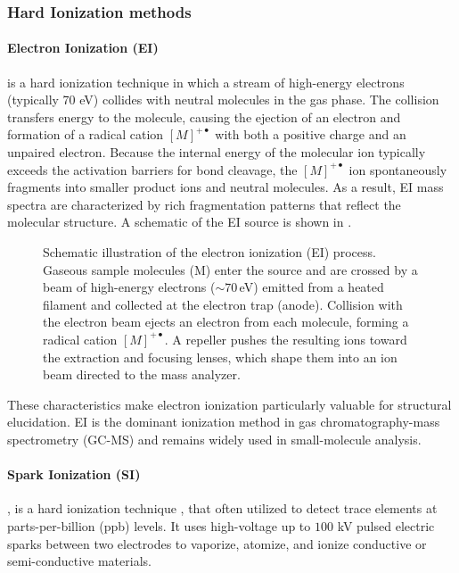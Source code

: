 \subsubsection{Hard Ionization methods}

\paragraph{Electron Ionization (EI)} is a hard ionization technique in which a stream of high-energy electrons (typically 70 eV) collides with neutral molecules in the gas phase. \cite[p.~197]{Gross2006}
The collision transfers energy to the molecule, causing the ejection of an electron and formation of a radical cation $[M]^{+\bullet}$ with both a positive charge and an unpaired electron. \cite[p.~194]{Gross2006}
Because the internal energy of the molecular ion typically exceeds the activation barriers for bond cleavage, the $[M]^{+\bullet}$ ion spontaneously fragments into smaller product ions and neutral molecules. \cite[p.~3]{Stoddard2016}
As a result, EI mass spectra are characterized by rich fragmentation patterns that reflect the molecular structure. \cite{Ashyrmamatov2025}
A schematic of the EI source is shown in .

\begin{figure}[H]
    \centering
    \resizebox{0.9\textwidth}{!}{}
    \caption[Schematic of EI ionization]{
        Schematic illustration of the electron ionization (EI) process.
        Gaseous sample molecules (M) enter the source and are crossed by a beam of high-energy electrons ($\sim 70$\,eV) emitted from a heated filament and collected at the electron trap (anode).
        Collision with the electron beam ejects an electron from each molecule, forming a radical cation $[M]^{+\bullet}$.
        A repeller pushes the resulting ions toward the extraction and focusing lenses, which shape them into an ion beam directed to the mass analyzer. \cite[p.18]{Dass2007}
    }
    \label{fig:ei-schematic}
\end{figure}


These characteristics make electron ionization particularly valuable for structural elucidation. \cite{VargasMedina2023}
EI is the dominant ionization method in gas chromatography-mass spectrometry (GC-MS) and remains widely used in small-molecule analysis. \cite[p.~1]{Amirav2021}

\paragraph{Spark Ionization (SI)}, is a hard ionization technique \cite[p.~1]{Lin2024}, that often utilized to detect trace elements at parts-per-billion (ppb) levels. \cite[p.~428]{Ganeev2016}
It uses high-voltage up to  $100$ kV pulsed electric sparks between two electrodes to vaporize, atomize, and ionize conductive or semi-conductive materials. \cite[p.~428]{Ganeev2016}

